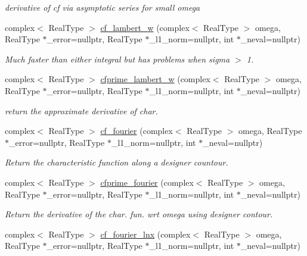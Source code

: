 \begin{DoxyCompactItemize}
\begin{DoxyCompactList}\small\item\em derivative of cf via asymptotic series for small omega \end{DoxyCompactList}\item 
complex$<$ Real\+Type $>$ \mbox{\hyperlink{structlognormal__distribution_a8764320a4993baf3b2c37e84e85f5930}{cf\+\_\+lambert\+\_\+w}} (complex$<$ Real\+Type $>$ omega, Real\+Type $\ast$\+\_\+error=nullptr, Real\+Type $\ast$\+\_\+l1\+\_\+norm=nullptr, int $\ast$\+\_\+neval=nullptr)
\begin{DoxyCompactList}\small\item\em Much faster than either integral but has problems when sigma $>$ 1. \end{DoxyCompactList}\item 
complex$<$ Real\+Type $>$ \mbox{\hyperlink{structlognormal__distribution_a21c4d9822769e84f959dca1bb741517f}{cfprime\+\_\+lambert\+\_\+w}} (complex$<$ Real\+Type $>$ omega, Real\+Type $\ast$\+\_\+error=nullptr, Real\+Type $\ast$\+\_\+l1\+\_\+norm=nullptr, int $\ast$\+\_\+neval=nullptr)
\begin{DoxyCompactList}\small\item\em return the approximate derivative of char. \end{DoxyCompactList}\item 
complex$<$ Real\+Type $>$ \mbox{\hyperlink{structlognormal__distribution_adb0238c0eed40f4e32f4ad35a107caee}{cf\+\_\+fourier}} (complex$<$ Real\+Type $>$ omega, Real\+Type $\ast$\+\_\+error=nullptr, Real\+Type $\ast$\+\_\+l1\+\_\+norm=nullptr, int $\ast$\+\_\+neval=nullptr)
\begin{DoxyCompactList}\small\item\em Return the characteristic function along a designer countour. \end{DoxyCompactList}\item 
complex$<$ Real\+Type $>$ \mbox{\hyperlink{structlognormal__distribution_af833fd54866c0c6a651b96c198294a11}{cfprime\+\_\+fourier}} (complex$<$ Real\+Type $>$ omega, Real\+Type $\ast$\+\_\+error=nullptr, Real\+Type $\ast$\+\_\+l1\+\_\+norm=nullptr, int $\ast$\+\_\+neval=nullptr)
\begin{DoxyCompactList}\small\item\em Return the derivative of the char. fun. wrt omega using designer contour. \end{DoxyCompactList}\item 
complex$<$ Real\+Type $>$ \mbox{\hyperlink{structlognormal__distribution_ab0a44ee2aad7c6f19cb4e3c930b993bd}{cf\+\_\+fourier\+\_\+lnx}} (complex$<$ Real\+Type $>$ omega, Real\+Type $\ast$\+\_\+error=nullptr, Real\+Type $\ast$\+\_\+l1\+\_\+norm=nullptr, int $\ast$\+\_\+neval=nullptr)

\end{DoxyCompactItemize}

